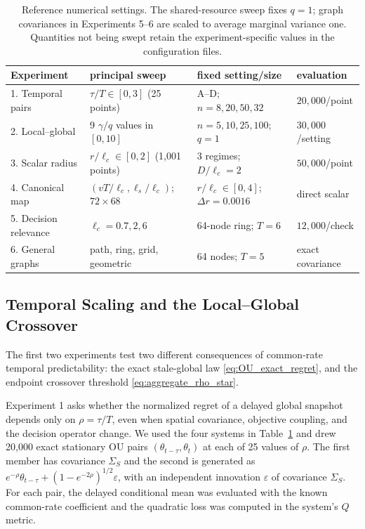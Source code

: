 \documentclass[11pt]{article}
\begin{document}
\begin{table}[H]
\centering
\caption{Reference numerical settings. The shared-resource sweep fixes $q=1$;
graph covariances in Experiments 5--6 are scaled to average marginal variance
one. Quantities not being swept retain the experiment-specific values in the
configuration files.}
\label{tab:numerical-parameters}
\small
\begin{tabular}{llll}
\toprule
Experiment & principal sweep & fixed setting/size & evaluation \\
\midrule
1. Temporal pairs & $\tau/T\in[0,3]$ (25 points) & A--D; $n=8,20,50,32$ & $20{,}000$/point \\
2. Local--global & 9 $\gamma/q$ values in $[0,10]$ & $n=5,10,25,100$; $q=1$ & $30{,}000$/setting \\
3. Scalar radius & $r/\ell_c\in[0,2]$ (1,001 points) & 3 regimes; $D/\ell_c=2$ & $50{,}000$/point \\
4. Canonical map & $(vT/\ell_c,\ell_s/\ell_c)$; $72\times68$ & $r/\ell_c\in[0,4]$; $\Delta r=0.0016$ & direct scalar \\
5. Decision relevance & $\ell_c=0.7,2,6$ & 64-node ring; $T=6$ & $12{,}000$/check \\
6. General graphs & path, ring, grid, geometric & 64 nodes; $T=5$ & exact covariance \\
\bottomrule
\end{tabular}
\end{table}

\subsection{Temporal Scaling and the Local--Global Crossover}
\label{subsec:numerical-temporal-crossover}

The first two experiments test two different consequences of common-rate
temporal predictability: the exact stale-global law
\eqref{eq:OU_exact_regret}, and the endpoint crossover threshold
\eqref{eq:aggregate_rho_star}.

Experiment 1 asks whether the normalized regret of a delayed global snapshot
depends only on $\rho=\tau/T$, even when spatial covariance, objective
coupling, and the decision operator change.  We used the four systems in
Table~\ref{tab:numerical-parameters} and drew 20,000 exact stationary OU pairs
$(\theta_{t-\tau},\theta_t)$ at each of 25 values of $\rho$.  The first member
has covariance $\Sigma_S$ and the second is generated as
$e^{-\rho}\theta_{t-\tau}+(1-e^{-2\rho})^{1/2}\varepsilon$, with an
independent innovation $\varepsilon$ of covariance $\Sigma_S$.  For each pair,
the delayed conditional mean was evaluated with the known common-rate
coefficient and the quadratic loss was computed in the system's $Q$ metric.
\end{document}
